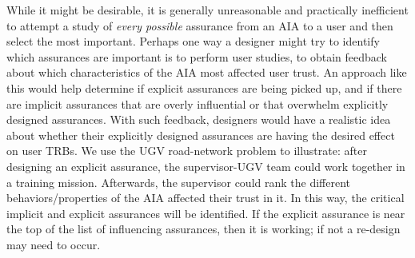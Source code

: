     While it might be desirable, it is generally unreasonable and practically inefficient to attempt a study of \emph{every possible} assurance from an AIA to a user and then select the most important. Perhaps one way a designer might try to identify which assurances are important is to perform user studies, to obtain feedback about which characteristics of the AIA most affected user trust. An approach like this would help determine if explicit assurances are being picked up, and if there are implicit assurances that are overly influential or that overwhelm explicitly designed assurances. With such feedback, designers would have a realistic idea about whether their explicitly designed assurances are having the desired effect on user TRBs. We use the UGV road-network problem to illustrate: after designing an explicit assurance, the supervisor-UGV team could work together in a training mission. Afterwards, the supervisor could rank the different behaviors/properties of the AIA affected their trust in it. In this way, the critical implicit and explicit assurances will be identified. If the explicit assurance is near the top of the list of influencing assurances, then it is working; if not a re-design may need to occur. 
